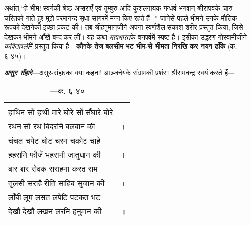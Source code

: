 \begin{sloppypar}\justifying{}
\noindent अर्थात् “हे भीम! स्वर्गकी श्रेष्ठ अप्सराएँ एवं तुम्बुरु आदि कुशलगायक गन्धर्व भगवान् श्रीराघवके चारु चरितको गाते हुए मुझे परमानन्द-सुधा-सागरमें मग्न किए रहते हैं।” जानेसे पहले भीमने उनके मौलिक रूपको देखनेकी इच्छा प्रकट की। तब श्रीहनुमान्‌जीने अपना स्वर्णशैल-संकाश शरीर प्रस्तुत किया, जिसे देखकर भीमने आँखें बन्द कर लीं। यह कथा \textit{महाभारत}के वनपर्वमें स्पष्ट है। इसीका उद्धरण गोस्वामीजीने \textit{कवितावली}में प्रस्तुत किया है—\textbf{कौनके तेज बलसीम भट भीम-से भीमता निरखि कर नयन ढाँके} (क. ६-४५)।
\end{sloppypar}
\begin{sloppypar}\justifying{}
\textbf{\textit{असुर सँहारे}}—असुर-संहारका क्या कहना! आञ्जनेयके संग्रामकी प्रशंसा श्रीरामचन्द्र स्वयं करते हैं—
\end{sloppypar}
{\bfseries
\setlength{\mylenone}{0pt}
\settowidth{\mylentwo}{हाथिन सों हाथी मारे घोरे सों सँघारे घोरे}
\setlength{\mylenone}{\maxof{\mylenone}{\mylentwo}}
\settowidth{\mylentwo}{रथन सों रथ बिदरनि बलवान की}
\setlength{\mylenone}{\maxof{\mylenone}{\mylentwo}}
\settowidth{\mylentwo}{चंचल चपेट चोट-चरन चकोट चाहे}
\setlength{\mylenone}{\maxof{\mylenone}{\mylentwo}}
\settowidth{\mylentwo}{हहरानि फौजें भहरानी जातुधान की}
\setlength{\mylenone}{\maxof{\mylenone}{\mylentwo}}
\settowidth{\mylentwo}{बार बार सेवक-सराहना करत राम}
\setlength{\mylenone}{\maxof{\mylenone}{\mylentwo}}
\settowidth{\mylentwo}{तुलसी सराहै रीति साहिब सुजान की}
\setlength{\mylenone}{\maxof{\mylenone}{\mylentwo}}
\settowidth{\mylentwo}{लाँबी लूम लसत लपेटि पटकत भट}
\setlength{\mylenone}{\maxof{\mylenone}{\mylentwo}}
\settowidth{\mylentwo}{देखौ देखौ लखन लरनि हनुमान की}
\setlength{\mylenone}{\maxof{\mylenone}{\mylentwo}}
\setlength{\mylentwo}{\baselineskip}
\setlength{\mylenone}{\mylenone + 1pt}
\begin{longtable}[l]{@{\hspace*{\mylen}}>{\setlength\parfillskip{0pt}}p{\mylenone}@{}@{}l@{}}
 & \\[-\the\mylentwo]
हाथिन सों हाथी मारे घोरे सों सँघारे घोरे & \\ \nopagebreak
रथन सों रथ बिदरनि बलवान की & ।\\
चंचल चपेट चोट-चरन चकोट चाहे & \\ \nopagebreak
हहरानि फौजें भहरानी जातुधान की & ।\\
बार बार सेवक-सराहना करत राम & \\ \nopagebreak
तुलसी सराहै रीति साहिब सुजान की & ।\\
लाँबी लूम लसत लपेटि पटकत भट & \\ \nopagebreak
देखौ देखौ लखन लरनि हनुमान की & ॥\\ \nopagebreak
\caption*{—क. ६-४०}
\end{longtable}
}
